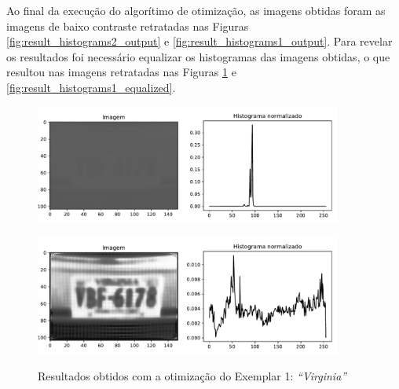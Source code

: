 Ao final da execução do algorítimo de otimização, as imagens obtidas foram as imagens de
baixo contraste retratadas nas Figuras \ref{fig:result_histograms2_output} e
\ref{fig:result_histograms1_output}.
Para revelar os resultados foi necessário equalizar os histogramas das imagens obtidas,
o que resultou nas imagens retratadas nas Figuras \ref{fig:result_histograms2_equalized}
e \ref{fig:result_histograms1_equalized}.

\begin{figure}
	\centering
	\caption{Resultados obtidos com a otimização do Exemplar 1: \emph{``Virginia''}}
	\label{fig:result_histograms2}
	\begin{minipage}[b]{.99\linewidth}
		\includegraphics[width = 0.9\textwidth]{./figures/results_figures/histograma3.pdf}
		\label{fig:result_histograms2_output}
	\end{minipage}	

	\begin{minipage}[b]{.99\linewidth}
		\includegraphics[width = 0.9\textwidth]{./figures/results_figures/histograma4.pdf}
		\label{fig:result_histograms2_equalized}
	\end{minipage}	
	
\end{figure}

